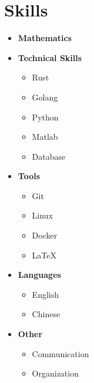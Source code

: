 \documentclass{article}
\begin{document}
\section*{Skills}
\begin{itemize}[leftmargin=*]
    \item \textbf{Mathematics}
    \item \textbf{Technical Skills}
    \begin{itemize}
        \item Rust
        \item Golang
        \item Python
        \item Matlab
        \item Database
    \end{itemize}
    \item \textbf{Tools}
    \begin{itemize}
        \item Git
        \item Linux
        \item Docker
        \item \LaTeX
    \end{itemize}
    \item \textbf{Languages}
    \begin{itemize}
        \item English
        \item Chinese
    \end{itemize}
    \item \textbf{Other}
    \begin{itemize}
        \item Communication
        \item Organization
    \end{itemize}
\end{itemize}
\end{document}
